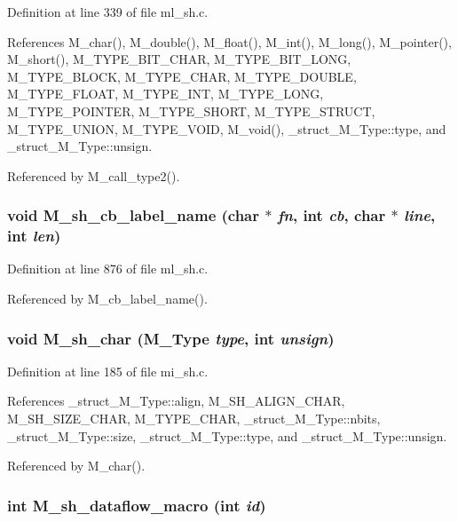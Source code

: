 Definition at line 339 of file ml\_\-sh.c.

References M\_\-char(), M\_\-double(), M\_\-float(), M\_\-int(), M\_\-long(), M\_\-pointer(), M\_\-short(), M\_\-TYPE\_\-BIT\_\-CHAR, M\_\-TYPE\_\-BIT\_\-LONG, M\_\-TYPE\_\-BLOCK, M\_\-TYPE\_\-CHAR, M\_\-TYPE\_\-DOUBLE, M\_\-TYPE\_\-FLOAT, M\_\-TYPE\_\-INT, M\_\-TYPE\_\-LONG, M\_\-TYPE\_\-POINTER, M\_\-TYPE\_\-SHORT, M\_\-TYPE\_\-STRUCT, M\_\-TYPE\_\-UNION, M\_\-TYPE\_\-VOID, M\_\-void(), \_\-struct\_\-M\_\-Type::type, and \_\-struct\_\-M\_\-Type::unsign.

Referenced by M\_\-call\_\-type2().
\subsubsection{\setlength{\rightskip}{0pt plus 5cm}void M\_\-sh\_\-cb\_\-label\_\-name (char $\ast$ {\em fn}, int {\em cb}, char $\ast$ {\em line}, int {\em len})}\label{m__sh_8h_5336e99237f6e7db25b0df9a947c375c}




Definition at line 876 of file ml\_\-sh.c.

Referenced by M\_\-cb\_\-label\_\-name().
\subsubsection{\setlength{\rightskip}{0pt plus 5cm}void M\_\-sh\_\-char (\bf{M\_\-Type} {\em type}, int {\em unsign})}\label{m__sh_8h_f2ab2bcc98d514b1d8c249f3c1f3d235}




Definition at line 185 of file mi\_\-sh.c.

References \_\-struct\_\-M\_\-Type::align, M\_\-SH\_\-ALIGN\_\-CHAR, M\_\-SH\_\-SIZE\_\-CHAR, M\_\-TYPE\_\-CHAR, \_\-struct\_\-M\_\-Type::nbits, \_\-struct\_\-M\_\-Type::size, \_\-struct\_\-M\_\-Type::type, and \_\-struct\_\-M\_\-Type::unsign.

Referenced by M\_\-char().
\subsubsection{\setlength{\rightskip}{0pt plus 5cm}int M\_\-sh\_\-dataflow\_\-macro (int {\em id})}\label{m__sh_8h_dac0d1a86686d0675f40ea5c845443d4}




